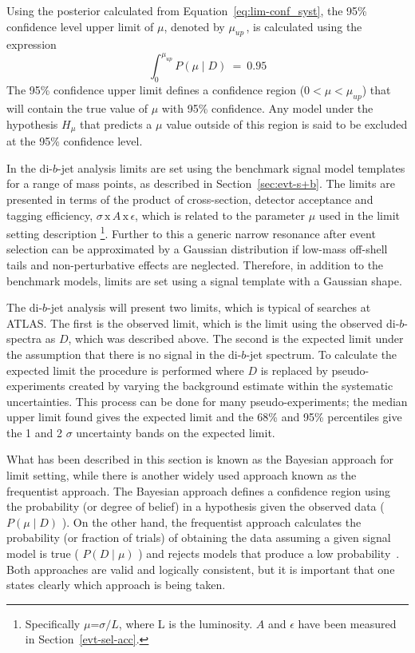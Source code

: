 Using the posterior calculated from Equation~\ref{eq:lim-conf_syst},
the 95\% confidence level upper limit of $\mu$, denoted by $\mu_{up}\,$,
is calculated using the expression
\begin{equation}
\int_0^{\mu_{up}} P(\mu \mid D)~=~0.95
\end{equation}
The 95\% confidence upper limit
defines a confidence region ($0 < \mu < \mu_{up}$)
that will contain the true value of $\mu$ with 95\% confidence.
Any model under the hypothesis $H_{\mu}$ that predicts a $\mu$
value outside of this region is said to be excluded at the 95\% confidence level.

In the di-$b$-jet analysis limits are set using the benchmark signal model templates for a range of mass points,
as described in Section~\ref{sec:evt-s+b}.
The limits are presented in terms of the product of cross-section, detector acceptance and tagging efficiency,
$\sigma\,\text{x}\,\mathit{A}\,\text{x}\,\epsilon$,
which is related to the parameter $\mu$ used in the limit setting description
\footnote{
  Specifically $\mu$=$\sigma/L$, where L is the luminosity.
  $\mathit{A}$ and $\epsilon$ have been measured in Section~\ref{evt-sel-acc}.
}.
Further to this a generic narrow resonance after event selection can be approximated by a Gaussian distribution
if low-mass off-shell tails and non-perturbative effects are neglected.
Therefore, in addition to the benchmark models, limits are set using
a signal template with a Gaussian shape.
  
The di-$b$-jet analysis will present two limits, which is typical of searches at ATLAS.
The first is the observed limit, which is the limit using the observed di-$b$-spectra as $D$, which was described above.
The second is the expected limit under the assumption that there is no signal in the di-$b$-jet spectrum.
To calculate the expected limit the procedure is performed where $D$ is replaced by pseudo-experiments
created by varying the background estimate within the systematic uncertainties.
This process can be done for many pseudo-experiments; the median upper limit found gives the expected limit
and the 68\% and 95\% percentiles give the 1 and 2 $\sigma$ uncertainty bands on the expected limit.

What has been described in this section is known as the Bayesian approach for limit setting,
while there is another widely used approach known as the frequentist approach.
The Bayesian approach defines a confidence region using the probability (or degree of belief) in a hypothesis given the observed data ( $P(\mu \mid D)$ ).
On the other hand, the frequentist approach calculates the probability (or fraction of trials)
of obtaining the data assuming a given signal model is true ( $P(D \mid \mu)$ ) and rejects models that produce a low probability~\cite{lim-cowan}.
Both approaches are valid and logically consistent,
but it is important that one states clearly which approach is being taken.

